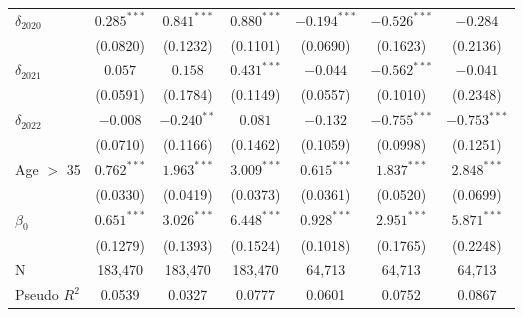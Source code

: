 \begin{tabular}{l|ccc|ccc}
$\delta_{2020}$               &   $0.285^{***}$ &   $0.841^{***}$ &   $0.880^{***}$ &         $-0.194^{***}$ &  $-0.526^{***}$ &        $-0.284$ \\
                              &        (0.0820) &        (0.1232) &        (0.1101) &               (0.0690) &        (0.1623) &        (0.2136) \\
$\delta_{2021}$               &         $0.057$ &         $0.158$ &   $0.431^{***}$ &               $-0.044$ &  $-0.562^{***}$ &        $-0.041$ \\
                              &        (0.0591) &        (0.1784) &        (0.1149) &               (0.0557) &        (0.1010) &        (0.2348) \\
$\delta_{2022}$               &        $-0.008$ &   $-0.240^{**}$ &         $0.081$ &               $-0.132$ &  $-0.755^{***}$ &  $-0.753^{***}$ \\
                              &        (0.0710) &        (0.1166) &        (0.1462) &               (0.1059) &        (0.0998) &        (0.1251) \\
Age $>$ 35                    &   $0.762^{***}$ &   $1.963^{***}$ &   $3.009^{***}$ &          $0.615^{***}$ &   $1.837^{***}$ &   $2.848^{***}$ \\
                              &        (0.0330) &        (0.0419) &        (0.0373) &               (0.0361) &        (0.0520) &        (0.0699) \\
$\beta_0$                     &   $0.651^{***}$ &   $3.026^{***}$ &   $6.448^{***}$ &          $0.928^{***}$ &   $2.951^{***}$ &   $5.871^{***}$ \\
                              &        (0.1279) &        (0.1393) &        (0.1524) &               (0.1018) &        (0.1765) &        (0.2248) \\
N                             &         183,470 &         183,470 &         183,470 &                 64,713 &          64,713 &          64,713 \\
Pseudo $R^2$                  &          0.0539 &          0.0327 &          0.0777 &                 0.0601 &          0.0752 &          0.0867 \\
\bottomrule
\end{tabular}
